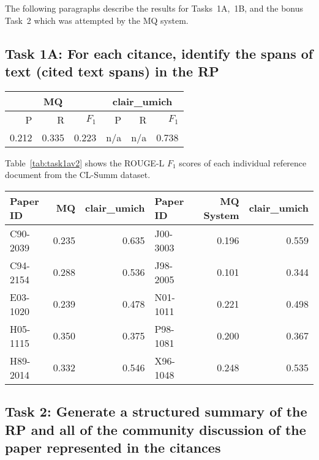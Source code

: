 \documentclass[11pt]{article}
\begin{document}
The following paragraphs describe the results for Tasks~1A,~1B, and the
bonus Task~2 which was attempted by the MQ system.

\subsection{Task 1A: For each citance, identify the spans of text (cited text spans) in the RP}

\begin{table*}
\centering
	\begin{tabular}{|r|r|r|r|r|r|}
	\hline
	\multicolumn{3}{|c|}{MQ} & \multicolumn{3}{|c|}{clair\_umich}\\
	\hline
	P & R & $F_1$ & P & R & $F_1$\\
	\hline
	0.212 & 0.335 & 0.223 & n/a & n/a & 0.738\\
	\hline
	\end{tabular}
\caption{Task~1A performance for the participating systems expressed as ROUGE-L score
 averaged over all topics.}
\label{tab:task1a}
\end{table*}

Table~\ref{tab:task1av2} shows the ROUGE-L $F_1$ scores of each individual 
reference document from the CL-Summ dataset.

\begin{table*}
  \centering
  \begin{tabular}{|l|r|r||l|r|r|}
  	\hline
	Paper ID & MQ  & clair\_umich & Paper ID & MQ System & clair\_umich \\
	\hline
	C90-2039 & 0.235 & 0.635 &	J00-3003 & 0.196 & 0.559\\
	C94-2154 & 0.288 & 0.536 &	J98-2005 & 0.101 & 0.344\\
	E03-1020 & 0.239 & 0.478 &	N01-1011 & 0.221 & 0.498\\
	H05-1115 & 0.350 & 0.375 &	P98-1081 & 0.200 & 0.367\\
	H89-2014 & 0.332 & 0.546 &	X96-1048 & 0.248 & 0.535\\
	\hline
  \end{tabular}
\caption{Task~1A ROUGE-L F1 scores for individual topics.}
\label{tab:task1av2}
\end{table*}
\subsection{Task 2: Generate a structured summary of the RP and all of the community discussion of the paper represented in the citances}
\end{document}
